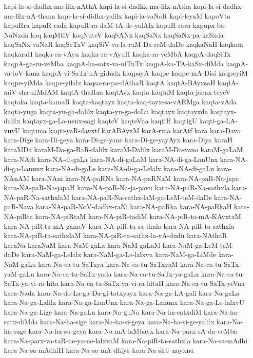 {kapi-la-si-dadhx-ma-lilx-nAthA
kapi-la-si-dadhx-ma-lilx-nAtha
kapi-la-si-dadhx-ma-lilx-nA-thana
kapi-la-si-didhx-yalilx
kapi-la-vaNaR
kapi-leyaM
kapoVta
kapuRra
kapuR-rada
kapuR-ra-daM-tA-de-yalAlx
kapuR-rava
kapupx-ba-NaNxda
kaq
kaqMtiV
kaqNuteV
kaqSANx
kaqSaNx
kaqSaNx-pa-kaSxda
kaqSaNx-vaNaR
kaqSeTxV
kaqSiV-va-la-ruM-Da-reM-daDe
kaqkaNaH
kaqkara
kaqkaraH
kaqka-ra-vAyu
kaqka-ra-vAyuH
kaqka-ra-veMbA
kaqpA-daqSiTx
kaqpA-gu-ru-veMba
kaqpA-ha-satx-va-niTuTx
kaqpA-ka-TA-kaSx-diMda
kaqpA-va-loV-kana
kaqpA-vi-SaTx-nA-gidudx
kaqpayA
kaqpe
kaqpe-mA-Disi
kaqpeyiM
kaqpe-yiMda
kaqpe-yilalx
kaqsa-ra-pa-dAthaR
kaqtA
kaqtA-BAyxsaH
kaqtA-miV-sha-niMdAM
kaqtA-thaRna
kaqtAvx
kaqta
kaqtaM
kaqta-jacnx-teyeV
kaqtaka
kaqta-kamaR
kaqta-kaqtayx
kaqta-kaq-tayx-sa-vARMga
kaqta-vAda
kaqta-yuga
kaqta-yu-ga-dalilx
kaqta-yu-ga-doLu
kaqtayx
kaqtayxda
kaqtayx-dalilx
kaqtayx-ga-La-nenx-sagi
kaqteV
kaqteVna
kaqtiH
kaqtigU
kaqti-ga-LA-vuvU
kaqtima
kaqti-yaR-dayxtf
karABAyxM
karA-rina
karAtf
kara
kara-Dava
kara-Dige
kara-Di-geya
kara-Di-ge-yane
kara-Di-ge-yayAyx
kara-Diya
karaH
karaMDa
karaM-Da-ga-BaR-dalilx
karaM-Dalilx
karaM-Da-vano
karaM-gaLaM
kara-NAdi
kara-NA-di-gaLa
kara-NA-di-gaLaM
kara-NA-di-ga-LanUnx
kara-NA-di-ga-Lanunx
kara-NA-di-gaLe
kara-NA-di-ga-Lelalx
kara-NA-di-gaLu
kara-NAnAM
kara-NAni
kara-NA-paRNa
kara-NA-paRNaM
kara-NA-paR-Na-japa
kara-NA-paR-Na-japaH
kara-NA-paR-Na-ja-pavu
kara-NA-paR-Na-sathxla
kara-NA-paR-Na-sathxlaM
kara-NA-paR-Na-sathx-laM-ga-LeM-teM-daDe
kara-NA-paR-Nava
kara-NA-paR-NoV-dadhx-raNi
kara-NA-paRka
kara-NA-paRkaH
kara-NA-piRta
kara-NA-piRtaM
kara-NA-piR-tadiM
kara-NA-piR-ta-mA-KAyxtaM
kara-NA-piR-ta-mA-gameV
kara-NA-piR-ta-sa-thala
kara-NA-piR-ta-sathxla
kara-NA-piR-ta-sathxlaM
kara-NA-piR-ta-sathx-la-vA-dudu
kara-NAthaR
karaNa
karaNaM
kara-NaM-gaLa
kara-NaM-gaLaM
kara-NaM-ga-LeM-teM-daDe
kara-NaM-ga-Lelalx
kara-NaM-ga-Le-lalxvu
kara-NaM-ga-LiMde
kara-NaM-gaLu
kara-Na-ca-tu-SaTxya
kara-Na-ca-tu-SaTxyaM
kara-Na-ca-tu-SaTx-yaM-gaLu
kara-Na-ca-tu-SaTx-yada
kara-Na-ca-tu-SaTx-ya-gaLu
kara-Na-ca-tu-SaTx-ya-vi-ra-hita
kara-Na-ca-tu-SaTx-ya-vi-ra-hitaH
kara-Na-ca-tu-SaTx-yeVna
kara-Nada
kara-Na-do-La-ga-Da-gi-tatxyayx
kara-Na-ga-LA-gali
kara-Na-gaLa
kara-Na-ga-Lalilx
kara-Na-ga-LanUnx
kara-Na-ga-Lanunx
kara-Na-ga-Le-lalxvU
kara-Na-ga-Lige
kara-Na-gaLu
kara-Na-guNa
kara-Na-ha-satxdiM
kara-Na-ha-satx-diMda
kara-Na-ha-sige
kara-Na-ha-si-geya
kara-Na-ha-si-ge-yalilx
kara-Na-ha-suge
kara-Na-ha-su-geya
kara-Na-mA-laMbayx
kara-Na-parx-sA-da-veMba
kara-Na-parx-va-taR-ne-ya-ne-lalxvaM
kara-Na-piR-ta-sathxla
kara-Na-sa-mAdhi
kara-Na-sa-mAdhiH
kara-Na-sa-mA-dhiya
kara-Na-shU-nayxnu
}
